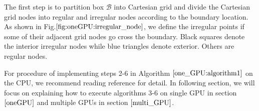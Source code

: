 The first step is to partition box $\mathcal{B}$ into Cartesian grid and divide the Cartesian grid nodes into regular and irregular nodes according to the boundary location. As shown in Fig.$\ref{fig:oneGPU:irregular_node}$, we define the irregular points if some of their adjacent grid nodes go cross the boundary. Black squares denote the interior irregular nodes while blue triangles denote exterior. Others are regular nodes.

For procedure of implementing steps 2-6 in Algorithm $\ref{one_GPU:algorithm1}$ on the CPU, we recommend reading reference \cite{ying2007kernel} for detail. In following section, we will focus on explaining how to execute algorithms 3-6 on single GPU in section $\ref{oneGPU}$ and multiple GPUs in section $\ref{multi_GPU}$.
